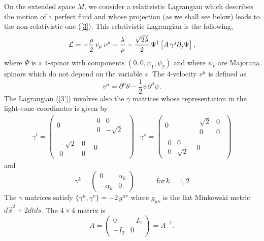 \documentclass[11pt,a4paper]{article}
\begin{document}
On the extended space $M$, we consider a relativistic Lagrangian which describes the motion of a perfect fluid and whose projection (as we shall see below) leads to the non-relativistic one (\ref{3}). This relativistic Lagrangian is the following,
\begin{eqnarray}
{\cal L}=-\frac{\rho}{2}\,v_\mu\,v^\mu-\frac{\lambda}{\rho}-\frac{\sqrt{2\lambda}}{2}\,\Psi^\dagger\left[A\,\gamma^j\partial_j\Psi\right],
\label{3'}
\end{eqnarray}
where $\Psi$ is a $4$-spinor with components $(0,0,\psi_1,\psi_2)$ and where $\psi_k$ are Majorana spinors which do not depend on the variable $s$. The $4$-velocity $v^\mu$ is defined as 
$$
v^\mu=\partial^\mu\theta-\frac{1}{2}\psi\partial^\mu\psi.
$$
The Lagrangian (\ref{3'}) involves also the $\gamma$ matrices whose representation in the light-cone coordinates is given by
$$
\begin{array}{cc}
\gamma^t=\left(
\begin{array}{cc}
0 & \begin{array}{cc}
    0 & 0 \\
    0 & -\sqrt{2}
    \end{array} 
\\
 \begin{array}{cc}
    -\sqrt{2} & 0 \\
    0 & 0
    \end{array} & 0
\end{array}
\right)
& 
\gamma^s=\left(
\begin{array}{cc}
0 & \begin{array}{cc}
    \sqrt{2} &  0\\
    0 &  0
    \end{array}
\\
 \begin{array}{cc}
    0 & 0 \\
    0 & \sqrt{2}
    \end{array} & 0
\end{array}
\right)
\end{array}
$$
and 
$$
\gamma^k=\left(
\begin{array}{cc}
0 & \alpha_k\\
-\alpha_k & 0
\end{array}
\right)\qquad\quad\mbox{for}\,k=1, 2
$$
The $\gamma$ matrices satisfy $\{ \gamma^\mu,\gamma^\nu\}= -2\,g^{\mu\nu}$ where $g_{\mu\nu}$ is the flat Minkowski metric $d\vec{x}^2+2dtds$. The $4\times 4$ matrix is
$$
A=\left(
\begin{array}{cc}
0 & -I_2\\
-I_2 & 0
\end{array}
\right)=A^{-1}.
$$
\end{document}
